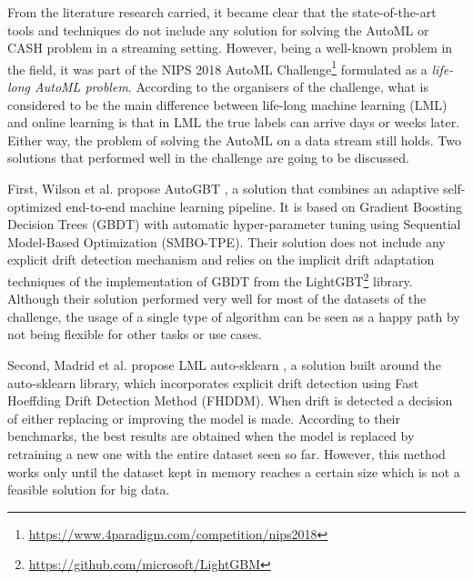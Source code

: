 \documentclass{sig-alternate-br}
\begin{document}
From the literature research carried, it became clear that the state-of-the-art tools and techniques do not include any solution for solving the AutoML or CASH problem in a streaming setting. However, being a well-known problem in the field, it was part of the NIPS 2018 AutoML Challenge\footnote{\url{https://www.4paradigm.com/competition/nips2018}} formulated as a \emph{life-long AutoML problem}. According to the organisers of the challenge, what is considered to be the main difference between life-long machine learning (LML) and online learning is that in LML the true labels can arrive days or weeks later. Either way, the problem of solving the AutoML on a data stream still holds. Two solutions that performed well in the challenge are going to be discussed. 

First, Wilson et al. propose AutoGBT \cite{wilson2020automatically}, a solution that combines an adaptive self-optimized end-to-end machine learning pipeline. It is based on Gradient Boosting Decision Trees (GBDT) with automatic hyper-parameter tuning using Sequential Model-Based Optimization (SMBO-TPE). Their solution does not include any explicit drift detection mechanism and relies on the implicit drift adaptation techniques of the implementation of GBDT from the LightGBT\footnote{\url{https://github.com/microsoft/LightGBM}} library. Although their solution performed very well for most of the datasets of the challenge, the usage of a single type of algorithm can be seen as a happy path by not being flexible for other tasks or use cases.

Second, Madrid et al. propose LML auto-sklearn \cite{madrid2019towards}, a solution built around the auto-sklearn library, which incorporates explicit drift detection using Fast Hoeffding Drift Detection Method (FHDDM). When drift is detected a decision of either replacing or improving the model is made. According to their benchmarks, the best results are obtained when the model is replaced by retraining a new one with the entire dataset seen so far. However, this method works only until the dataset kept in memory reaches a certain size which is not a feasible solution for big data.
\end{document}
